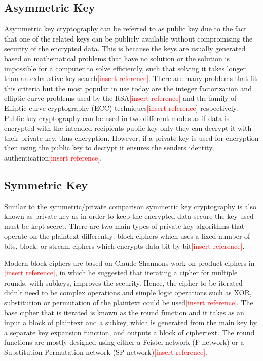 \documentclass[12pt,twoside,a4paper]{report}
\begin{document}
    \subsection{Asymmetric Key}
    Asymmetric key cryptography can be referred to as public key due to the fact that one of the related keys can be publicly available without compromising the security of the encrypted data. This is because the keys are usually generated based on mathematical problems that have no solution or the solution is impossible for a computer to solve efficiently, such that solving it takes longer than an exhaustive key search\textcolor{red}{[insert reference]}. There are many problems that fit this criteria but the most popular in use today are the integer factorization and elliptic curve problems used by the RSA\textcolor{red}{[insert reference]} and the family of Elliptic-curve cryptography (ECC) techniques\textcolor{red}{[insert reference]} respectively. Public key cryptography can be used in two different modes as if data is encrypted with the intended recipients public key only they can decrypt it with their private key, thus encryption. However, if a private key is used for encryption then using the public key to decrypt it ensures the senders identity, authentication\textcolor{red}{[insert reference]}.
    
    \subsection{Symmetric Key}
    Similar to the symmetric/private comparison symmetric key cryptography is also known as private key as in order to keep the encrypted data secure the key used must be kept secret. There are two main types of private key algorithms that operate on the plaintext differently: block ciphers which uses a fixed number of bits, block; or stream ciphers which encrypts data bit by bit\textcolor{red}{[insert reference]}.
    
    Modern block ciphers are based on Claude Shannons work on product ciphers in \textcolor{red}{[insert reference]}, in which he suggested that iterating a cipher for multiple rounds, with subkeys, improves the security. Hence, the cipher to be iterated didn't need to be complex operations and simple logic operations such as XOR, substitution or permutation of the plaintext could be used\textcolor{red}{[insert reference]}. The base cipher that is iterated is known as the round function and it takes as an input a block of plaintext and a subkey, which is generated from the main key by a separate key expansion function, and outputs a block of ciphertext. The round functions are mostly designed using either a Feistel network (F network) or a Substitution Permutation network (SP network)\textcolor{red}{[insert reference]}.
    
\end{document}
